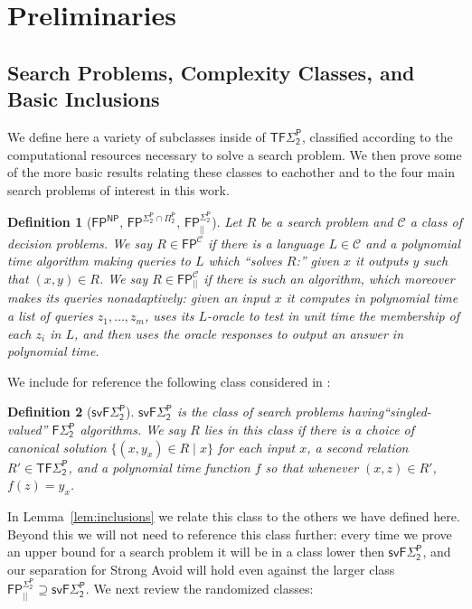 \documentclass[11pt]{article}
\newtheorem{definition}{Definition}
\begin{document}
\section{Preliminaries}
\label{sec:prelims}
\subsection{Search Problems, Complexity Classes, and Basic Inclusions}
\label{sec:totalsearch}
We define here a variety of subclasses inside of $\mathsf{TF\Sigma_2^P}$, classified according to the computational resources necessary to solve a search problem. We then prove some of the more basic results relating these classes to eachother and to the four main search problems of interest in this work.

\begin{definition}[$\mathsf{FP^{NP}}$, $\mathsf{FP^{\Sigma_2^P \cap \Pi_2^P}}$, $\mathsf{FP_{||}^{\Sigma_2^P}}$]
Let $R$ be a search problem and $\mathcal{C}$ a class of decision problems. We say $R \in \mathsf{FP}^\mathcal{C}$ if there is a language $L \in \mathcal{C}$ and a polynomial time algorithm making queries to $L$ which ``solves $R$:'' given $x$ it outputs $y$ such that $(x,y) \in R$. We say $R \in \mathsf{FP}_{||}^{\mathcal{C}}$ if there is such an algorithm, which moreover makes its queries \emph{nonadaptively}: given an input $x$ it computes in polynomial time a list of queries $z_1,\ldots,z_m$, uses its $L$-oracle to test in unit time the membership of each $z_i$ in $L$, and then uses the oracle responses to output an answer in polynomial time.
\end{definition}

We include for reference the following class considered in \cite{Li,CHR}:
\begin{definition}[$\mathsf{svF\Sigma_2^P}$]
$\mathsf{svF\Sigma_2^P}$ is the class of search problems having``singled-valued'' $\mathsf{F\Sigma_2^P}$ algorithms. We say $R$ lies in this class if there is a choice of canonical solution $\{(x,y_x)\in R \mid x\}$ for each input $x$, a second relation $R' \in \mathsf{TF\Sigma_2^P}$, and a polynomial time function $f$ so that whenever $(x,z) \in R'$, $f(z)=y_x$.
\end{definition}
In Lemma~\ref{lem:inclusions} we relate this class to the others we have defined here. Beyond this we will not need to reference this class further: every time we prove an upper bound for a search problem it will be in a class lower then $\mathsf{svF\Sigma_2^P}$, and our separation for Strong Avoid will hold even against the larger class $\mathsf{FP_{||}^{\Sigma_2^P}} \supseteq \mathsf{svF\Sigma_2^P}$. We next review the randomized classes:
\end{document}
